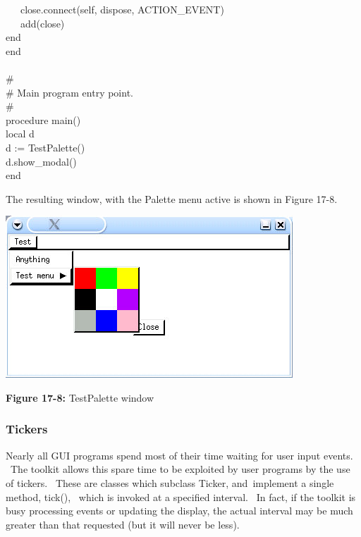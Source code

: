 {\>   \ \ \ close.connect(self, {\textquotedbl}dispose{\textquotedbl},
ACTION\_EVENT) \\
\>   \ \ \ add(close) \\
\>   end \\
end \\
\ \\
\# \\
\# Main program entry point. \\
\# \\
procedure main() \\
\>   local d \\
\>   d := TestPalette() \\
\>   d.show\_modal() \\
end
}

\bigskip

The resulting window, with the \textsf{Palette} menu active is shown in
Figure 17-8.

\begin{center}
\includegraphics[width=4.2398in,height=2.3953in]{ub-img/ub-img57.jpg}
\end{center}

{\sffamily\bfseries Figure 17-8:}
{\sffamily TestPalette window}

\subsubsection{Tickers}
Nearly all GUI programs spend most of their time waiting for user input
events. \ The toolkit allows this spare time to be exploited by user
programs by the use of {\textquotedbl}tickers{\textquotedbl}. \ These
are classes which subclass \textsf{Ticker}, and\texttt{ }implement a
single method, \textsf{tick()}, \ which is invoked at a specified
interval. \ In fact, if the toolkit is busy processing events or
updating the display, the actual interval may be much greater than that
requested (but it will never be less).

